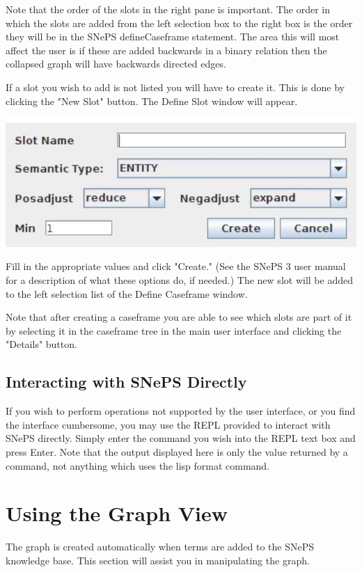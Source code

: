 \documentclass[10pt]{article}
\begin{document}
Note that the order of the slots in the right pane is important. The order in which the slots are added from the left selection box to the right box is the order they will be in the SNePS defineCaseframe statement. The area this will most affect the user is if these are added backwards in a binary relation then the collapsed graph will have backwards directed edges.

If a slot you wish to add is not listed you will have to create it. This is done by clicking the "New Slot" button. The Define Slot window will appear.

\begin{center}
\includegraphics[max width=\textwidth]{2023_06_06_402e2c8ca4c84733095bg-5}
\end{center}

Fill in the appropriate values and click "Create." (See the SNePS 3 user manual for a description of what these options do, if needed.) The new slot will be added to the left selection list of the Define Caseframe window.

Note that after creating a caseframe you are able to see which slots are part of it by selecting it in the caseframe tree in the main user interface and clicking the "Details" button.

\subsection{Interacting with SNePS Directly}
If you wish to perform operations not supported by the user interface, or you find the interface cumbersome, you may use the REPL provided to interact with SNePS directly. Simply enter the command you wish into the REPL text box and press Enter. Note that the output displayed here is only the value returned by a command, not anything which uses the lisp format command.

\section{Using the Graph View}
The graph is created automatically when terms are added to the SNePS knowledge base. This section will assist you in manipulating the graph.
\end{document}
